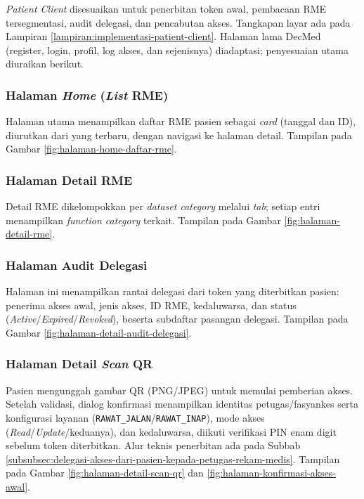 \documentclass[bahasa, 12pt, a4paper, onecolumn, oneside, final]{report}
\begin{document}
\textit{Patient Client} disesuaikan untuk penerbitan token awal, pembacaan RME tersegmentasi, audit delegasi, dan pencabutan akses. Tangkapan layar ada pada Lampiran \ref{lampiran:implementasi-patient-client}. Halaman lama DecMed (register, login, profil, log akses, dan sejenisnya) diadaptasi; penyesuaian utama diuraikan berikut.

\subsubsection{Halaman \textit{Home} (\textit{List} RME)}
\label{subsubsec:halaman-home-daftar-rme}

Halaman utama menampilkan daftar RME pasien sebagai \textit{card} (tanggal dan ID), diurutkan dari yang terbaru, dengan navigasi ke halaman detail. Tampilan pada Gambar \ref{fig:halaman-home-daftar-rme}.

\subsubsection{Halaman Detail RME}
\label{subsubsec:halaman-detail-rme}

Detail RME dikelompokkan per \textit{dataset category} melalui \textit{tab}; setiap entri menampilkan \textit{function category} terkait. Tampilan pada Gambar \ref{fig:halaman-detail-rme}.

\subsubsection{Halaman Audit Delegasi}
\label{subsubsec:halaman-audit-delegasi}

Halaman ini menampilkan rantai delegasi dari token yang diterbitkan pasien: penerima akses awal, jenis akses, ID RME, kedaluwarsa, dan status (\textit{Active}/\textit{Expired}/\textit{Revoked}), beserta subdaftar pasangan delegasi. Tampilan pada Gambar \ref{fig:halaman-detail-audit-delegasi}.

\subsubsection{Halaman Detail \textit{Scan} QR}
\label{subsubsec:halaman-detail-scan-qr}

Pasien mengunggah gambar QR (PNG/JPEG) untuk memulai pemberian akses. Setelah validasi, dialog konfirmasi menampilkan identitas petugas/fasyankes serta konfigurasi layanan (\texttt{RAWAT\_JALAN}/\texttt{RAWAT\_INAP}), mode akses (\textit{Read}/\textit{Update}/keduanya), dan kedaluwarsa, diikuti verifikasi PIN enam digit sebelum token diterbitkan. Alur teknis penerbitan ada pada Subbab \ref{subsubsec:delegasi-akses-dari-pasien-kepada-petugas-rekam-medis}. Tampilan pada Gambar \ref{fig:halaman-detail-scan-qr} dan \ref{fig:halaman-konfirmasi-akses-awal}.
\end{document}

